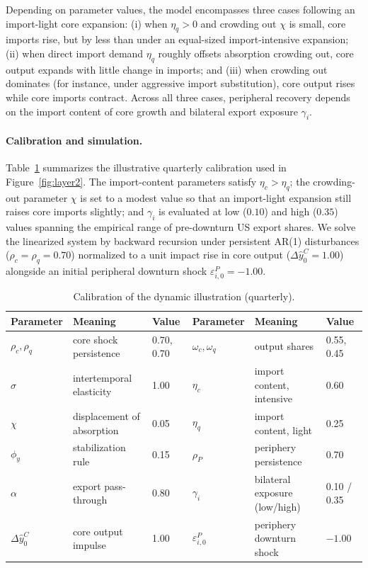 \documentclass[12pt, a4paper]{article}
\begin{document}
Depending on parameter values, the model encompasses three cases following an import-light core expansion: (i) when $\eta_q > 0$ and crowding out $\chi$ is small, core imports rise, but by less than under an equal-sized import-intensive expansion; (ii) when direct import demand $\eta_q$ roughly offsets absorption crowding out, core output expands with little change in imports; and (iii) when crowding out dominates (for instance, under aggressive import substitution), core output rises while core imports contract. Across all three cases, peripheral recovery depends on the import content of core growth and bilateral export exposure $\gamma_i$.

\paragraph{Calibration and simulation.}
Table~\ref{tab:calib} summarizes the illustrative quarterly calibration used in Figure~\ref{fig:layer2}. The import-content parameters satisfy $\eta_c>\eta_q$; the crowding-out parameter $\chi$ is set to a modest value so that an import-light expansion still raises core imports slightly; and $\gamma_i$ is evaluated at low ($0.10$) and high ($0.35$) values spanning the empirical range of pre-downturn US export shares. We solve the linearized system by backward recursion under persistent AR(1) disturbances ($\rho_c=\rho_q=0.70$) normalized to a unit impact rise in core output ($\Delta \hat y_0^C = 1.00$) alongside an initial peripheral downturn shock $\varepsilon_{i,0}^P = -1.00$.

\begin{table}[H]
\centering\small
\caption{Calibration of the dynamic illustration (quarterly).}
\label{tab:calib}
{\setlength{\tabcolsep}{5pt}
\begin{tabular}{@{}lll@{\hskip 1.5em}lll@{}}
\toprule
Parameter & Meaning & Value & Parameter & Meaning & Value \\ \midrule
$\rho_c,\rho_q$ & core shock persistence & 0.70, 0.70 & $\omega_c,\omega_q$ & output shares & 0.55, 0.45 \\
$\sigma$ & intertemporal elasticity & 1.00 & $\eta_c$ & import content, intensive & 0.60 \\
$\chi$ & displacement of absorption & 0.05 & $\eta_q$ & import content, light & 0.25 \\
$\phi_y$ & stabilization rule & 0.15 & $\rho_P$ & periphery persistence & 0.70 \\
$\alpha$ & export pass-through & 0.80 & $\gamma_i$ & bilateral exposure (low/high) & 0.10 / 0.35 \\
$\Delta \hat y_0^C$ & core output impulse & 1.00 & $\varepsilon_{i,0}^P$ & periphery downturn shock & $-1.00$ \\
\bottomrule
\end{tabular}}
\end{table}
\end{document}
